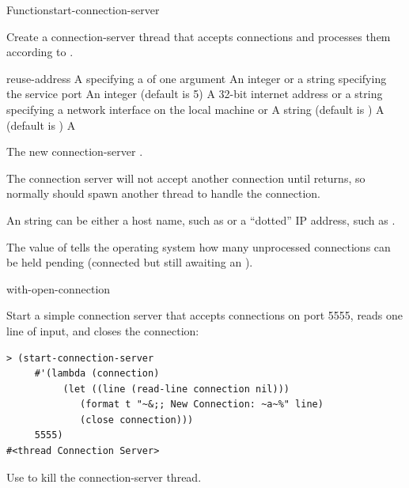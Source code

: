 \documentclass[10pt,twoside,english,pdftex]{article}
\begin{document}
\begin{functiondoc}{Function}{start-connection-server}%
  {
    }
%
%
%
%

\fnsyntax

\fnpurpose Create a connection-server thread that accepts connections
and processes them according to .

\fnpackage {}

\fnmodule {}

\fnargs
\begin{args}{reuse-address}
\arg[function] A  specifying a 
   of one argument
\arg[port] An integer or a string specifying the service port
\arg[backlog] An integer (default is 5)
\arg[interface] A 32-bit internet address or a string specifying a network 
interface on the local machine or \nil 
\arg[name] A string (default is )
 A  (default is \nil)
\arg[thread] A 
\end{args}

\fnreturns The new connection-server .

\fnerrors
\nothreads{}

%
\fndescription The connection server will not accept another
connection until  returns, so normally
 should spawn another thread to handle the
connection.  

An  string can be either a host name, such as
 or a ``dotted'' IP address, such as
.

The value of  tells the operating system
how many unprocessed connections can be held pending (connected but
still awaiting an ).

\begin{alsos}{with-open-connection}
\end{alsos}

\fnexample
Start a simple connection server that accepts connections on port
5555, reads one line of input, and closes the connection:
%
\W\supp
\begin{verbatim}
> (start-connection-server
     #'(lambda (connection)
          (let ((line (read-line connection nil)))
             (format t "~&;; New Connection: ~a~%" line)
             (close connection)))
     5555)
#<thread Connection Server>
\end{verbatim}

%
\fnnote Use  to kill the
connection-server thread.

\end{functiondoc}
\end{document}
